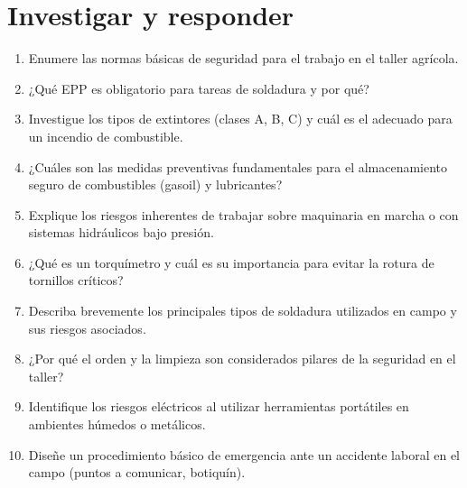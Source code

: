 \section*{\faPencil\space Investigar y responder}
\begin{enumerate}
	\item Enumere las normas básicas de seguridad para el trabajo en el taller agrícola.
	\item ¿Qué EPP es obligatorio para tareas de soldadura y por qué?
	\item Investigue los tipos de extintores (clases A, B, C) y cuál es el adecuado
	      para un incendio de combustible.
	\item ¿Cuáles son las medidas preventivas fundamentales para el almacenamiento
	      seguro de combustibles (gasoil) y lubricantes?
	\item Explique los riesgos inherentes de trabajar sobre maquinaria en marcha o con
	      sistemas hidráulicos bajo presión.
	\item ¿Qué es un torquímetro y cuál es su importancia para evitar la rotura de
	      tornillos críticos?
	\item Describa brevemente los principales tipos de soldadura utilizados en campo
	      y sus riesgos asociados.
	\item ¿Por qué el orden y la limpieza son considerados pilares de la seguridad en
	      el taller?
	\item Identifique los riesgos eléctricos al utilizar herramientas portátiles en
	      ambientes húmedos o metálicos.
	\item Diseñe un procedimiento básico de emergencia ante un accidente laboral en
	      el campo (puntos a comunicar, botiquín).
\end{enumerate}

